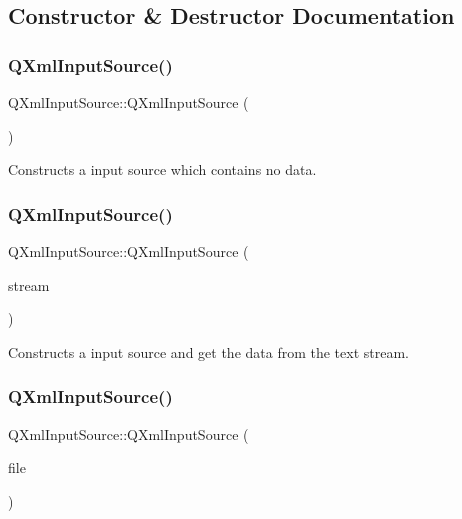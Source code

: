 \subsection{Constructor \& Destructor Documentation}
\mbox{\label{class_q_xml_input_source_ae01ad9dbd2e6d950fe4d43e7f7ba5e80}} 
\subsubsection{\texorpdfstring{QXmlInputSource()}{QXmlInputSource()}\hspace{0.1cm}{\footnotesize\ttfamily [1/3]}}
{\footnotesize\ttfamily Q\+Xml\+Input\+Source\+::\+Q\+Xml\+Input\+Source (\begin{DoxyParamCaption}{ }\end{DoxyParamCaption})}

Constructs a input source which contains no data. \mbox{\label{class_q_xml_input_source_a301b2d54ab84af500ac65257de94f23d}} 
\subsubsection{\texorpdfstring{QXmlInputSource()}{QXmlInputSource()}\hspace{0.1cm}{\footnotesize\ttfamily [2/3]}}
{\footnotesize\ttfamily Q\+Xml\+Input\+Source\+::\+Q\+Xml\+Input\+Source (\begin{DoxyParamCaption}\item[{\mbox{\hyperlink{class_q_text_stream}{Q\+Text\+Stream}} \&}]{stream }\end{DoxyParamCaption})}

Constructs a input source and get the data from the text stream. \mbox{\label{class_q_xml_input_source_af31832f657ee461a8fbe9b9f9227c218}} 
\subsubsection{\texorpdfstring{QXmlInputSource()}{QXmlInputSource()}\hspace{0.1cm}{\footnotesize\ttfamily [3/3]}}
{\footnotesize\ttfamily Q\+Xml\+Input\+Source\+::\+Q\+Xml\+Input\+Source (\begin{DoxyParamCaption}\item[{\mbox{\hyperlink{class_q_file}{Q\+File}} \&}]{file }\end{DoxyParamCaption})}

